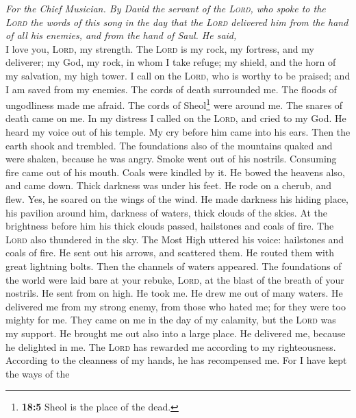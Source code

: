 \emph{For the Chief Musician. By David the servant of the \textsc{Lord},
who spoke to the \textsc{Lord} the words of this song in the day that
the \textsc{Lord} delivered him from the hand of all his enemies, and
from the hand of Saul. He said,}\\
 I love you, \textsc{Lord}, my strength. 
The \textsc{Lord} is my rock, my fortress, and my deliverer; my God, my
rock, in whom I take refuge; my shield, and the horn of my salvation, my
high tower.  I call on the \textsc{Lord}, who is worthy to
be praised; and I am saved from my enemies.  The cords of
death surrounded me. The floods of ungodliness made me afraid.
 The cords of Sheol\footnote{\textbf{18:5} Sheol is the
  place of the dead.} were around me. The snares of death came on me.
 In my distress I called on the \textsc{Lord}, and cried
to my God. He heard my voice out of his temple. My cry before him came
into his ears.  Then the earth shook and trembled. The
foundations also of the mountains quaked and were shaken, because he was
angry.  Smoke went out of his nostrils. Consuming fire
came out of his mouth. Coals were kindled by it.  He bowed
the heavens also, and came down. Thick darkness was under his feet.
 He rode on a cherub, and flew. Yes, he soared on the
wings of the wind.  He made darkness his hiding place,
his pavilion around him, darkness of waters, thick clouds of the skies.
 At the brightness before him his thick clouds passed,
hailstones and coals of fire.  The \textsc{Lord} also
thundered in the sky. The Most High uttered his voice: hailstones and
coals of fire.  He sent out his arrows, and scattered
them. He routed them with great lightning bolts.  Then
the channels of waters appeared. The foundations of the world were laid
bare at your rebuke, \textsc{Lord}, at the blast of the breath of your
nostrils.  He sent from on high. He took me. He drew me
out of many waters.  He delivered me from my strong
enemy, from those who hated me; for they were too mighty for me.
 They came on me in the day of my calamity, but the
\textsc{Lord} was my support.  He brought me out also
into a large place. He delivered me, because he delighted in me.
 The \textsc{Lord} has rewarded me according to my
righteousness. According to the cleanness of my hands, he has
recompensed me.  For I have kept the ways of the
